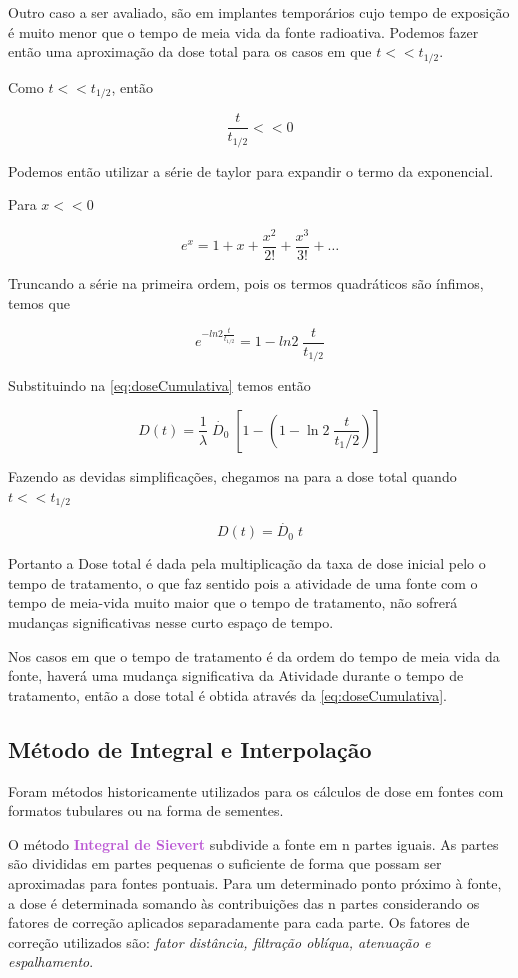 \documentclass[11pt,a4paper]{article}
\begin{document}
	Outro caso a ser avaliado, são em implantes temporários cujo tempo de exposição é muito menor que o tempo de meia vida da fonte radioativa. Podemos fazer então uma aproximação da dose total para os casos em que $t << t_{1/2}$. 


	Como $t << t_{1/2}$, então

	$$\frac{t}{t_{1/2}} << 0 $$

	Podemos então utilizar a série de taylor para expandir o termo da exponencial. 

	Para $x << 0$

	$$e^x = 1 + x + \frac{x^2}{2!} + \frac{x^3}{3!} + \dots$$

	Truncando a série na primeira ordem, pois os termos quadráticos são ínfimos, temos que

	$$ e^{-ln 2 \frac{t}{t_{1/2}}} = 1 - ln 2 \; \frac{t}{t_{1/2}}$$

	Substituindo na   \ref{eq:doseCumulativa} temos então

	$$D(t) = \frac{1}{\lambda} \; \dot{D_0} \; \left[1 - \left(1 - \ln 2 \; \frac{t}{t_1/2}\right)\right]$$

	Fazendo as devidas simplificações, chegamos na   para a dose total quando $t << t_{1/2}$

			\begin{equation}
				D(t) = \dot{D_0} \; t
				\label{eq:AproximacaoImplantesTemporarios}
			\end{equation}

	Portanto a Dose total é dada pela multiplicação da taxa de dose inicial pelo o tempo de tratamento, o que faz sentido pois a atividade de uma fonte com o tempo de meia-vida muito maior que o tempo de tratamento, não sofrerá mudanças significativas nesse curto espaço de tempo.


	Nos casos em que o tempo de tratamento é da ordem do tempo de meia vida da fonte, haverá uma mudança significativa da Atividade durante o tempo de tratamento, então a dose total é obtida através da   \ref{eq:doseCumulativa}.

\subsection*{Método de Integral e Interpolação}

	Foram métodos historicamente utilizados para os cálculos de dose em fontes com formatos tubulares ou na forma de sementes.

	O método \textbf{\textcolor{MediumOrchid}{Integral de Sievert}} subdivide a fonte em n partes iguais. As partes são divididas em partes pequenas o suficiente de forma que possam ser aproximadas para fontes pontuais. Para um determinado ponto próximo à fonte, a dose é determinada somando às contribuições das n partes considerando os fatores de correção aplicados separadamente para cada parte. Os fatores de correção utilizados são: \textit{fator distância, filtração oblíqua, atenuação e espalhamento}.
\end{document}
